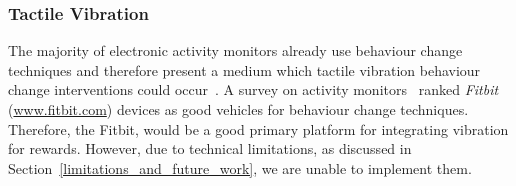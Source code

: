 \subsubsection{Tactile Vibration}
The majority of electronic activity monitors already use behaviour change techniques and therefore present a medium which tactile vibration behaviour change interventions could occur~\cite{benefits_of_audio_visual_1, article_designing_for_health_behaviour_change_hci}. A survey on activity monitors~\cite{article_wearable_good} ranked \textit{Fitbit} (\url{www.fitbit.com}) devices as good vehicles for behaviour change techniques. Therefore, the Fitbit, would be a good primary platform for integrating vibration for rewards. However, due to technical limitations, as discussed in Section~\ref{limitations_and_future_work}, we are unable to implement them.



